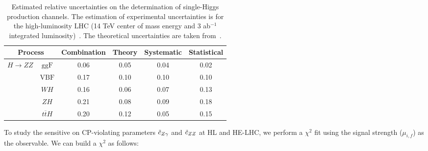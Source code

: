\begin{table*}
	\begin{center}
		\begin{tabular}{lc|cccc}
			\multicolumn{2}{c|}{Process}	 & Combination & Theory & Systematic & Statistical \\ \hline \hline
			\multirow{5}{*}{${H}\to {ZZ}$}   		&$\text{ggF}$& 0.06 & 0.05 & 0.04 & 0.02 \\
			&$\text{VBF}$& 0.17 & 0.10 & 0.10 & 0.10 \\
 			&${WH}$& 0.16 & 0.06 & 0.07 & 0.13 \\
 			&${ZH}$& 0.21 & 0.08 & 0.09 & 0.18 \\ 
 			&${t\overline tH}$& 0.20 & 0.12 & 0.05 & 0.15 \\ \hline
		\end{tabular}
		\caption{Estimated relative uncertainties on the determination of single-Higgs production channels. The 
		estimation of experimental uncertainties is for the high-luminosity LHC (14 TeV center of mass energy and 3 ab$^{-1}$ integrated luminosity)~\cite{}. The theoretical 
		uncertainties are taken from~\cite{}.}\label{tab:one}
	\end{center}
\end{table*}


To study the sensitive on CP-violating parameters $\tilde c_{Z\gamma}$ and $\tilde c_{ZZ}$ at HL and HE-LHC, we perform a $\chi^2$ fit using 
the signal strength ($\mu_{i,f}$) as the observable. 
We can build a $\chi^2$  as follows:

